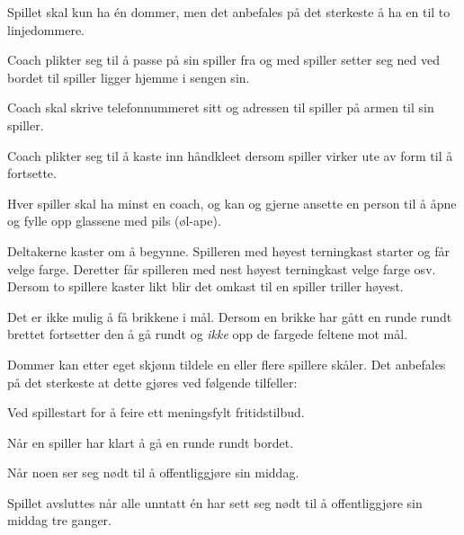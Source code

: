 \documentclass[10pt,a4paper,norsk,openany]{book}
\begin{document}
\begin{hus}
\item \label{sec:hus} Spillet skal kun ha én dommer, men det anbefales på det
  sterkeste å ha en til to linjedommere.

\item Coach plikter seg til å passe på sin spiller fra og med spiller setter seg
  ned ved bordet til spiller ligger hjemme i sengen sin.

\item Coach skal skrive telefonnummeret sitt og adressen til spiller på armen
  til sin spiller.

  \item Coach plikter seg til å kaste inn håndkleet dersom spiller virker ute av
    form til å fortsette. 

\item \label{sec:hus-coach} Hver spiller skal ha minst en coach, og kan og
  gjerne ansette en person til å åpne og fylle opp glassene med pils (øl-ape).
    
\item \label{par:hus-start} Deltakerne kaster om å begynne. Spilleren med høyest
  terningkast starter og får velge farge. Deretter får spilleren med nest høyest
  terningkast velge farge osv. Dersom to spillere kaster likt blir det omkast
  til en spiller triller høyest.
    
\item \label{par:hus-hjem} Det er ikke mulig å få brikkene i mål. Dersom en
  brikke har gått en runde rundt brettet fortsetter den å gå rundt og
  \emph{ikke} opp de fargede feltene mot mål.
    
\item Dommer kan etter eget skjønn tildele en eller flere spillere skåler. Det
  anbefales på det sterkeste at dette gjøres ved følgende tilfeller:
    
    \begin{hus}
    \item Ved spillestart for å feire ett meningsfylt fritidstilbud.
      
    \item Når en spiller har klart å gå en runde rundt bordet.
      
    \item Når noen ser seg nødt til å offentliggjøre sin middag.
    \end{hus}
      
  \item \label{par:hus-avsluttes} Spillet avsluttes når alle unntatt én har sett
    seg nødt til å offentliggjøre sin middag tre ganger.
\end{hus}
\end{document}

